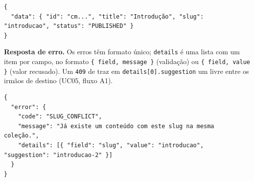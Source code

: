 \begin{lstlisting}[language=VJSON, caption={Formato padrão de sucesso}, label={lst:sucesso-json}]
{
  "data": { "id": "cm...", "title": "Introdução", "slug": "introducao", "status": "PUBLISHED" }
}
\end{lstlisting}

\textbf{Resposta de erro.} Os erros têm formato único; \texttt{details} é uma lista com um item por campo, no formato \texttt{\{ field, message \}} (validação) ou \texttt{\{ field, value \}} (valor recusado). Um \texttt{409} de  traz em \texttt{details[0].suggestion} um  livre entre os irmãos de destino (UC05, fluxo A1).

\begin{lstlisting}[language=VJSON, caption={Formato padrão de erro}, label={lst:erro-json}]
{
  "error": {
    "code": "SLUG_CONFLICT",
    "message": "Já existe um conteúdo com este slug na mesma coleção.",
    "details": [{ "field": "slug", "value": "introducao", "suggestion": "introducao-2" }]
  }
}
\end{lstlisting}

